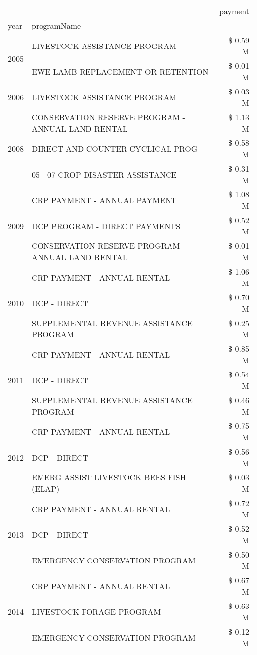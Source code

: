 \begin{tabular}{llr}
\toprule
 &  & payment \\
year & programName &  \\
\midrule
\multirow[t]{2}{*}{2005} & LIVESTOCK ASSISTANCE PROGRAM & \$ 0.59 M \\
 & EWE LAMB REPLACEMENT OR RETENTION & \$ 0.01 M \\
\cline{1-3}
2006 & LIVESTOCK ASSISTANCE PROGRAM & \$ 0.03 M \\
\cline{1-3}
\multirow[t]{3}{*}{2008} & CONSERVATION RESERVE PROGRAM - ANNUAL LAND RENTAL & \$ 1.13 M \\
 & DIRECT AND COUNTER CYCLICAL PROG & \$ 0.58 M \\
 & 05 - 07 CROP DISASTER ASSISTANCE & \$ 0.31 M \\
\cline{1-3}
\multirow[t]{3}{*}{2009} & CRP PAYMENT - ANNUAL PAYMENT & \$ 1.08 M \\
 & DCP PROGRAM - DIRECT PAYMENTS & \$ 0.52 M \\
 & CONSERVATION RESERVE PROGRAM - ANNUAL LAND RENTAL & \$ 0.01 M \\
\cline{1-3}
\multirow[t]{3}{*}{2010} & CRP PAYMENT - ANNUAL RENTAL & \$ 1.06 M \\
 & DCP - DIRECT & \$ 0.70 M \\
 & SUPPLEMENTAL REVENUE ASSISTANCE PROGRAM & \$ 0.25 M \\
\cline{1-3}
\multirow[t]{3}{*}{2011} & CRP PAYMENT - ANNUAL RENTAL & \$ 0.85 M \\
 & DCP - DIRECT & \$ 0.54 M \\
 & SUPPLEMENTAL REVENUE ASSISTANCE PROGRAM & \$ 0.46 M \\
\cline{1-3}
\multirow[t]{3}{*}{2012} & CRP PAYMENT - ANNUAL RENTAL & \$ 0.75 M \\
 & DCP - DIRECT & \$ 0.56 M \\
 & EMERG ASSIST LIVESTOCK BEES FISH (ELAP) & \$ 0.03 M \\
\cline{1-3}
\multirow[t]{3}{*}{2013} & CRP PAYMENT - ANNUAL RENTAL & \$ 0.72 M \\
 & DCP - DIRECT & \$ 0.52 M \\
 & EMERGENCY CONSERVATION PROGRAM & \$ 0.50 M \\
\cline{1-3}
\multirow[t]{3}{*}{2014} & CRP PAYMENT - ANNUAL RENTAL & \$ 0.67 M \\
 & LIVESTOCK FORAGE PROGRAM & \$ 0.63 M \\
 & EMERGENCY CONSERVATION PROGRAM & \$ 0.12 M \\

\end{tabular}
